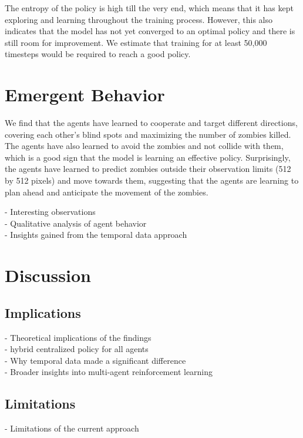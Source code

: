 \documentclass{article}
\begin{document}
The entropy of the policy is high till the very end, which means that it has kept exploring and learning throughout the training process. 
However, this also indicates that the model has not yet converged to an optimal policy and there is still room for improvement. We estimate that 
training for at least 50,000 timesteps would be required to reach a good policy. 



\section{Emergent Behavior}
We find that the agents have learned to cooperate and target different directions, covering each other's blind spots and maximizing the number of zombies killed.
The agents have also learned to avoid the zombies and not collide with them, which is a good sign that the model is learning an effective policy.
Surprisingly, the agents have learned to predict zombies outside their observation limits (512 by 512 pixels) and move towards them, suggesting that the agents are learning to plan ahead and anticipate the movement of the zombies.


- Interesting observations\\
- Qualitative analysis of agent behavior\\
- Insights gained from the temporal data approach

\section{Discussion}

\subsection{Implications}
- Theoretical implications of the findings\\
  - hybrid centralized policy for all agents\\
- Why temporal data made a significant difference\\
- Broader insights into multi-agent reinforcement learning

\subsection{Limitations}
- Limitations of the current approach
\end{document}
